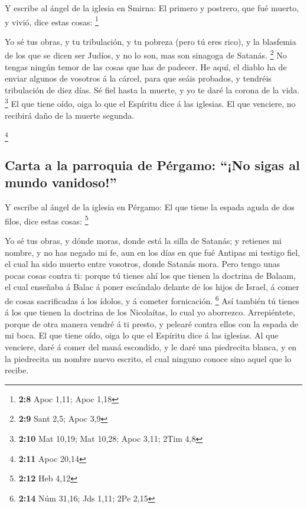  Y escribe al ángel de la iglesia en Smirna: El primero y
postrero, que fué muerto, y vivió, dice estas cosas: \footnote{\textbf{2:8}
  Apoc 1,11; Apoc 1,18}

 Yo sé tus obras, y tu tribulación, y tu pobreza (pero tú
eres rico), y la blasfemia de los que se dicen ser Judíos, y no lo son,
mas son sinagoga de Satanás. \footnote{\textbf{2:9} Sant 2,5; Apoc 3,9}
 No tengas ningún temor de las cosas que has de padecer.
He aquí, el diablo ha de enviar algunos de vosotros á la cárcel, para
que seáis probados, y tendréis tribulación de diez días. Sé fiel hasta
la muerte, y yo te daré la corona de la vida. \footnote{\textbf{2:10}
  Mat 10,19; Mat 10,28; Apoc 3,11; 2Tim 4,8}  El que
tiene oído, oiga lo que el Espíritu dice á las iglesias. El que
venciere, no recibirá daño de la muerte segunda.

\footnote{\textbf{2:11} Apoc 20,14}

\hypertarget{carta-a-la-parroquia-de-puxe9rgamo-no-sigas-al-mundo-vanidoso}{%
\subsection{Carta a la parroquia de Pérgamo: ``¡No sigas al mundo
vanidoso!''}\label{carta-a-la-parroquia-de-puxe9rgamo-no-sigas-al-mundo-vanidoso}}

 Y escribe al ángel de la iglesia en Pérgamo: El que
tiene la espada aguda de dos filos, dice estas cosas: \footnote{\textbf{2:12}
  Heb 4,12}

 Yo sé tus obras, y dónde moras, donde está la silla de
Satanás; y retienes mi nombre, y no has negado mi fe, aun en los días en
que fué Antipas mi testigo fiel, el cual ha sido muerto entre vosotros,
donde Satanás mora.  Pero tengo unas pocas cosas contra
ti: porque tú tienes ahí los que tienen la doctrina de Balaam, el cual
enseñaba á Balac á poner escándalo delante de los hijos de Israel, á
comer de cosas sacrificadas á los ídolos, y á cometer fornicación.
\footnote{\textbf{2:14} Núm 31,16; Jds 1,11; 2Pe 2,15} 
Así también tú tienes á los que tienen la doctrina de los Nicolaítas, lo
cual yo aborrezco.  Arrepiéntete, porque de otra manera
vendré á ti presto, y pelearé contra ellos con la espada de mi boca.
 El que tiene oído, oiga lo que el Espíritu dice á las
iglesias. Al que venciere, daré á comer del maná escondido, y le daré
una piedrecita blanca, y en la piedrecita un nombre nuevo escrito, el
cual ninguno conoce sino aquel que lo recibe.

